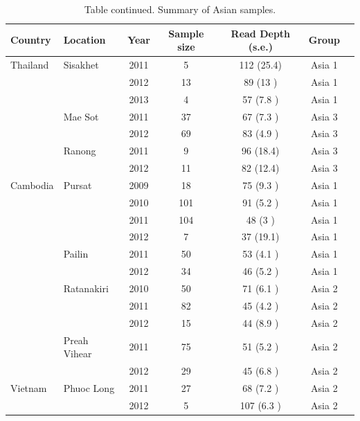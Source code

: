 \documentclass[9pt,lineno]{elife}
\begin{document}
\begin{table}[bt]
\ContinuedFloat
\caption{Table continued.  Summary of Asian samples.}
\begin{tabular}{l l c c c c c}
\toprule
Country & Location & Year & Sample size & Read Depth (s.e.) & Group \\
\midrule
Thailand        &Sisakhet       &2011 &5    &112  (25.4)&Asia 1  \\
                &               &2012 &13   &89   (13  )&Asia 1  \\
                &               &2013 &4    &57   (7.8 )&Asia 1  \\
                &Mae Sot        &2011 &37   &67   (7.3 )&Asia 3  \\
                &               &2012 &69   &83   (4.9 )&Asia 3  \\
                &Ranong         &2011 &9    &96   (18.4)&Asia 3  \\
                &               &2012 &11   &82   (12.4)&Asia 3  \\
 \hline
Cambodia        &Pursat         &2009 &18   &75   (9.3 )&Asia 1  \\
                &               &2010 &101  &91   (5.2 )&Asia 1  \\
                &               &2011 &104  &48   (3   )&Asia 1  \\
                &               &2012 &7    &37   (19.1)&Asia 1  \\
                &Pailin         &2011 &50   &53   (4.1 )&Asia 1  \\
                &               &2012 &34   &46   (5.2 )&Asia 1  \\
                &Ratanakiri     &2010 &50   &71   (6.1 )&Asia 2  \\
                &               &2011 &82   &45   (4.2 )&Asia 2  \\
                &               &2012 &15   &44   (8.9 )&Asia 2  \\
                &Preah Vihear   &2011 &75   &51   (5.2 )&Asia 2  \\
                &               &2012 &29   &45   (6.8 )&Asia 2  \\
 \hline
Vietnam         &Phuoc Long     &2011 &27   &68   (7.2 )&Asia 2  \\
                &               &2012 &5    &107  (6.3 )&Asia 2  \\

\end{tabular}
\end{table}
\end{document}
